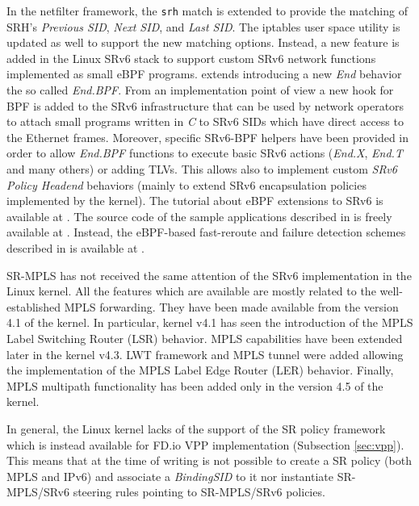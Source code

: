 In the netfilter framework, the \texttt{srh} match is extended to provide the matching of SRH's \textit{Previous SID}, \textit{Next SID}, and \textit{Last SID}. The iptables user space utility is updated as well to support the new matching options. Instead, a new feature is added in the Linux SRv6 stack to support custom SRv6 network functions implemented as small eBPF \cite{lwn-ebpf} programs. \cite{xhonneux2018leveraging} extends \cite{id-srv6-network-prog} introducing a new \textit{End} behavior the so called \textit{End.BPF}. From an implementation point of view a new hook for BPF is added to the SRv6 infrastructure that can be used by network operators to attach small programs written in \textit{C} to SRv6 SIDs which have direct access to the Ethernet frames. Moreover, specific SRv6-BPF helpers have been provided in order to allow \textit{End.BPF} functions to execute basic SRv6 actions (\textit{End.X}, \textit{End.T} and many others) or adding TLVs. This allows also to implement custom \textit{SRv6 Policy Headend} behaviors (mainly to extend SRv6 encapsulation policies implemented by the kernel). The tutorial about eBPF extensions to SRv6 is available at \cite{srv6-ebpf-tutorial}. The source code of the sample applications described in \cite{xhonneux2018leveraging} is freely available at \cite{srv6-ebpf-code1}. Instead, the eBPF-based fast-reroute and failure detection schemes described in \cite{xhonneux2018flexible} is available at \cite{srv6-ebpf-code2}.

SR-MPLS has not received the same attention of the SRv6 implementation in the Linux kernel. All the features which are available are mostly related to the well-established MPLS forwarding. They have been made available from the version 4.1 of the kernel. In particular, kernel v4.1 has seen the introduction of the MPLS Label Switching Router (LSR) behavior. MPLS capabilities have been extended later in the kernel v4.3. LWT framework and MPLS tunnel were added allowing the implementation of the MPLS Label Edge Router (LER) behavior. Finally, MPLS multipath functionality has been added only in the version 4.5 of the kernel.

In general, the Linux kernel lacks of the support of the SR policy framework which is instead available for FD.io VPP implementation (Subsection \ref{sec:vpp}). This means that at the time of writing is not possible to create a SR policy (both MPLS and IPv6) and associate a \textit{BindingSID} to it nor instantiate SR-MPLS/SRv6 steering rules pointing to SR-MPLS/SRv6 policies.

